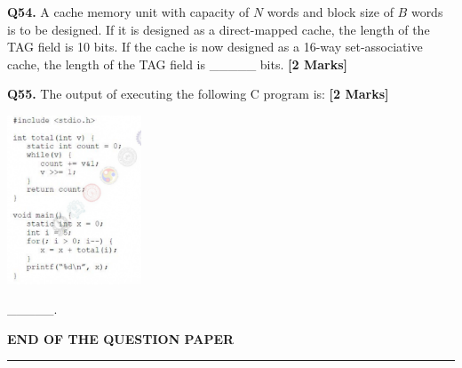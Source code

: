 \documentclass[11pt]{article}
\newcommand{\questionb}[2]{
    \noindent\textbf{Q#2.} #1 \hfill \textbf{[2 Marks]}
}
\begin{document}
\questionb{A cache memory unit with capacity of \( N \) words and block size of \( B \) words is to be designed.  
If it is designed as a direct-mapped cache, the length of the TAG field is 10 bits.  
If the cache is now designed as a 16-way set-associative cache, the length of the TAG field is \_\_\_\_\_ bits.}{54}
\vspace{0.5cm}

\questionb{The output of executing the following C program is:}{55}
\begin{center}
\includegraphics[width=0.3\textwidth]{figures/55.png}
\end{center}
\_\_\_\_\_.  
\vspace{0.5cm}
\vspace{2cm}
\begin{center}
\textbf{END OF THE QUESTION PAPER} \\
\rule{\textwidth}{0.5pt}
\end{center}
\end{document}
